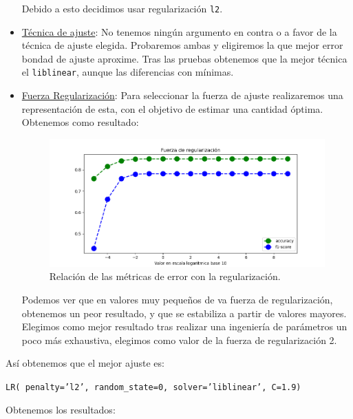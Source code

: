 \documentclass[11pt,a4paper]{article}
\begin{document}
\begin{itemize}
\begin{itemize}
  \end{itemize}

Debido a esto decidimos usar regularización \texttt{l2}. 

\item \underline{Técnica de ajuste}: No tenemos ningún argumento en contra o a favor de la técnica de ajuste elegida. Probaremos ambas y eligiremos la que mejor error bondad de ajuste aproxime. Tras las pruebas obtenemos que la mejor técnica el \texttt{liblinear}, aunque las diferencias con mínimas.

\item \underline{Fuerza Regularización}:   Para seleccionar la fuerza de ajuste realizaremos una representación de esta, con el objetivo de estimar una cantidad óptima. Obtenemos como resultado:
    \begin{figure}[h!]
      \label{figure:regularization}
      \centering
      \includegraphics[width=\textwidth]{./figures/regularizacion_rl.png}
      \caption{Relación de las métricas de error con la regularización.}
    \end{figure}

Podemos ver que en valores muy pequeños de va fuerza de regularización, obtenemos un peor resultado, y que se estabiliza a partir de valores mayores. Elegimos como mejor resultado tras realizar una ingeniería de parámetros un poco más exhaustiva, elegimos como valor de la fuerza de regularización 2.\\
\end{itemize}


Así obtenemos que el mejor ajuste es:

{\begin{center}
    \texttt{LR( penalty='l2', random\_state=0, solver='liblinear', C=1.9)}
  \end{center}}

Obtenemos los resultados:
\end{document}
